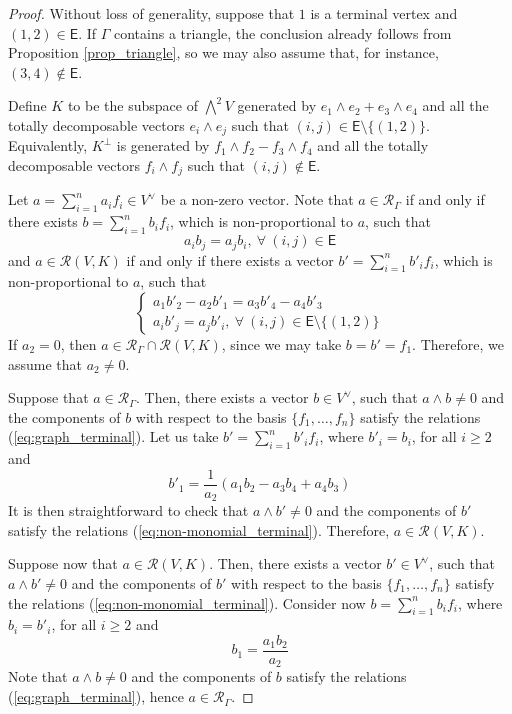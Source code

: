 \documentclass[10pt,a4paper]{amsart}
\newcommand{\cR}{\mathcal{R}}
\begin{document}
\begin{proof}
Without loss of generality, suppose that $1$ is a terminal vertex and $(1,2) \in \mathsf{E}$. If $\Gamma$ contains a triangle, the conclusion already follows from Proposition \ref{prop_triangle}, so we may also assume that, for instance, $(3,4) \notin \mathsf{E}$.

Define $K$ to be the subspace of $\bigwedge^2V$ generated by $e_1 \wedge e_2 + e_3 \wedge e_4$ and all the totally decomposable vectors $e_i \wedge e_j$ such that $(i,j) \in \mathsf{E} \setminus \{(1,2)\}$. Equivalently, $K^\perp$ is generated by $f_1 \wedge f_2 - f_3 \wedge f_4$ and all the totally decomposable vectors $f_i \wedge f_j$ such that $(i,j) \notin \mathsf{E}$.

Let $a  = \sum_{i=1}^n a_i f_i \in V^\vee$ be a non-zero vector. Note that $a \in \cR_\Gamma$ if and only if there exists $b = \sum_{i=1}^n b_i f_i$, which is non-proportional to $a$, such that
\begin{equation} \label{eq:graph_terminal}
    a_i b_j = a_j b_i, \ \forall \ (i,j) \in \mathsf{E}
\end{equation}
and $a \in \cR(V,K)$ if and only if there exists a vector $b' = \sum_{i=1}^n b'_i f_i$, which is non-proportional to $a$, such that
\begin{equation} \label{eq:non-monomial_terminal}
    \begin{cases}
        a_1 b'_2 - a_2 b'_1 = a_3 b'_4 - a_4 b'_3 \\
        a_i b'_j = a_j b'_i, \ \forall \ (i,j) \in \mathsf{E}\setminus \{(1,2)\}
    \end{cases}
\end{equation}
If $a_2 = 0$, then $a \in \cR_\Gamma \cap \cR(V,K)$, since we may take $b = b' = f_1$. Therefore, we assume that $a_2 \neq 0$.

Suppose that $a \in \cR_\Gamma$. Then, there exists a vector $b \in V^\vee$, such that $a \wedge b \neq 0$ and the components of $b$ with respect to the basis $\{f_1, \ldots, f_n\}$ satisfy the relations (\ref{eq:graph_terminal}). Let us take $b' = \sum_{i=1}^n b'_i f_i$, where $b'_i = b_i$, for all $i \ge 2$ and
\[
b'_1 = \frac{1}{a_2}(a_1 b_2 - a_3 b_4 + a_4 b_3)
\]
It is then straightforward to check that $a \wedge b' \neq 0$ and the components of $b'$ satisfy the relations (\ref{eq:non-monomial_terminal}). Therefore, $a \in \cR(V,K)$.

Suppose now that $a \in \cR(V,K)$. Then, there exists a vector $b' \in V^\vee$, such that $a \wedge b' \neq 0$ and the components of $b'$ with respect to the basis $\{f_1, \ldots, f_n\}$ satisfy the relations (\ref{eq:non-monomial_terminal}). Consider now $b = \sum_{i=1}^n b_i f_i$, where $b_i = b'_i$, for all $i \ge 2$ and
\[
b_1 = \frac{a_1 b_2}{a_2}
\]
Note that $a \wedge b \neq 0$ and the components of $b$ satisfy the relations (\ref{eq:graph_terminal}), hence $a \in \cR_\Gamma$.
\end{proof}
\end{document}
